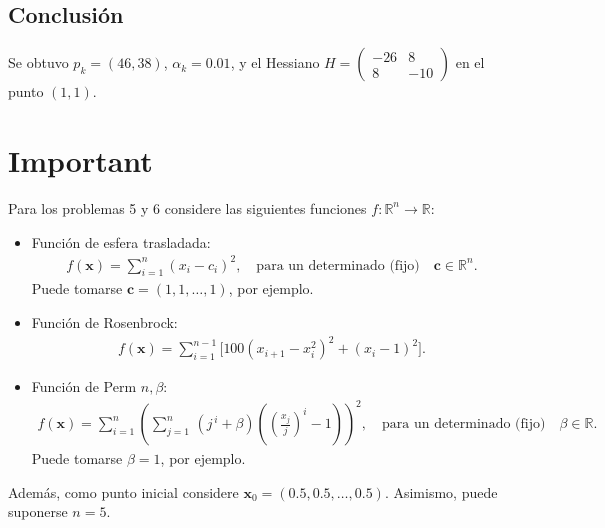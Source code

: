 \documentclass{article}
\begin{document}
\subsection{Conclusión}

Se obtuvo $p_k = (46, 38)$, $\alpha_k = 0.01$, y el Hessiano $H = \begin{pmatrix} -26 & 8 \\ 8 & -10 \end{pmatrix}$ en el punto $(1,1)$.

\section*{Important}

Para los problemas 5 y 6 considere las siguientes funciones $f : \mathbb{R}^n \rightarrow \mathbb{R}$:

\begin{itemize}
    \item Función de esfera trasladada:\\
    \begin{align} \tag{4}
        f(\mathbf{x}) = \sum_{i=1}^{n} (x_i - c_i)^2, \quad \text{para un determinado (fijo)} \quad \mathbf{c} \in \mathbb{R}^n.
    \end{align}
    Puede tomarse $\mathbf{c} = (1,1,\dots,1)$, por ejemplo.

    \item Función de Rosenbrock:\\
    \begin{align}  \tag{5}
        f(\mathbf{x}) = \sum_{i=1}^{n-1} \Big[ 100(x_{i+1} - x_i^{2})^{2} + (x_i - 1)^{2} \Big].
    \end{align}

    \item Función de Perm $n,\beta$:\\
    \begin{align}  \tag{6}
        f(\mathbf{x}) =
        \sum_{i=1}^{n} \left(
            \sum_{j=1}^{n}\,(j^{\,i} + \beta)\left( \left(\frac{x_j}{j}\right)^{i} - 1 \right)
        \right)^{2}, \quad \text{para un determinado (fijo)} \quad \beta \in \mathbb{R}.
    \end{align}
    Puede tomarse $\beta = 1$, por ejemplo.
\end{itemize}
Además, como punto inicial considere $\mathbf{x}_0 = (0.5,0.5,\dots,0.5)$. Asimismo, puede suponerse $n=5$.
\end{document}
